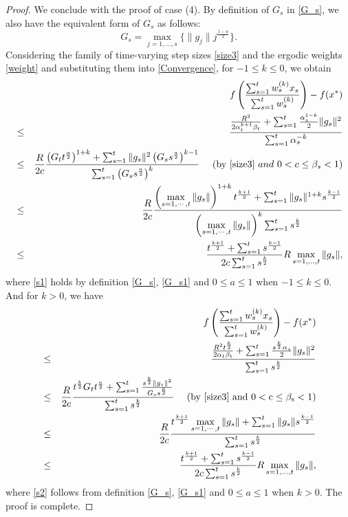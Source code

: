 \documentclass[sn-mathphys]{JORSC-jnl}%
\theoremstyle{thmstyleone}%
\theoremstyle{thmstylethree}%
\begin{document}
\begin{proof}
	We conclude with the proof of case (4). By definition of $G_s$ in \eqref{G_s}, we also have the equivalent form of $G_s$ as follows:
	\begin{equation}\label{G_s1}
		G_s = \max\limits_{j=1,\dots,s}{\{\|g_j\|j^{\frac{1-a}{2}}\}}.
	\end{equation}
	Considering the family of time-varying step sizes \eqref{size3} and the ergodic weights \eqref{weight} and substituting them into \eqref{Convergence}, for $-1 \le k \le 0$, we obtain
	\begin{eqnarray}
		&&f\left( \frac{\sum_{s=1}^t w_s^{(k)} x_s}{\sum_{s=1}^t w_s^{(k)}} \right) - f(x^*)\nonumber \\
		&\leq& \frac{\frac{R^2}{2\alpha_t^{k+1}\beta_t}+\sum_{s=1}^t\frac{\alpha_s^{1-k}}{2}\Vert g_s \Vert^2}{\sum_{s=1}^t \alpha_s^{-k}}\nonumber \\
		&\leq&
		\frac{R}{2c}\frac{\left({G_t t^{\frac{a}{2}}}\right)^{1+k}+\sum_{s=1}^t\Vert g_s \Vert^2 \left({G_s s^{\frac{a}{2}}}\right)^{k-1}}{\sum_{s=1}^t \left({G_s s^{\frac{a}{2}}}\right)^{k}} ~~~~({\rm by~ \eqref{size3}}~and ~0 < c \leq \beta_s <1)\nonumber \\
		&\leq&
		\frac{R}{2c}\frac{\left({\max\limits_{s=1,\cdots,t}{\|g_s\|}}\right)^{1+k}t^{\frac{k+1}{2}}+\sum_{s=1}^t\Vert g_s \Vert^{1+k}s^{\frac{k-1}{2}}}{\left({\max\limits_{s=1,\cdots,t}{\|g_s\|}}\right)^{k}\sum_{s=1}^t s^{\frac{k}{2}}} \label{s1}\\
		&\leq&
		\frac{t^{\frac{k+1}{2}} +\sum_{s=1}^{t} s^{\frac{k-1}{2}}}{2c\sum_{s=1}^{t} s^{\frac{k}{2}}} R\max\limits_{s=1,\dots,t}{\|g_s\|}, \nonumber
	\end{eqnarray}
	where \eqref{s1} holds by definition \eqref{G_s}, \eqref{G_s1} and $0 \leq a \leq 1$ when $-1 \leq k \leq 0$. And for $k > 0$, we have
	\begin{eqnarray}
		&&f\left( \frac{\sum_{s=1}^t w_s^{(k)} x_s}{\sum_{s=1}^t w_s^{(k)}} \right) - f(x^*)\nonumber \\
		&\leq& \frac{\frac{R^2 t^{\frac{k}{2}}}{2\alpha_t\beta_t}+\sum_{s=1}^t\frac{s^{\frac{k}{2}}\alpha_s}{2}\Vert g_s \Vert^2}{\sum_{s=1}^t s^{\frac{k}{2}}} \nonumber \\
		&\leq& \frac{R}{2c}\frac{t^{\frac{k}{2}}G_t t^{\frac{a}{2}}+\sum_{s=1}^t\frac{s^{\frac{k}{2}}\Vert g_s \Vert^2}{G_s s^{\frac{a}{2}}}}{\sum_{s=1}^t s^{\frac{k}{2}}} ~~~~({\rm by~ \eqref{size3}~ and ~0 < c \leq \beta_s <1})\nonumber \\
		&\leq& \frac{R}{2c}\frac{t^{\frac{k+1}{2}}\max\limits_{s=1,\cdots,t}{\|g_s\|}+\sum_{s=1}^t\Vert g_s \Vert s^{\frac{k-1}{2}}}{\sum_{s=1}^t s^{\frac{k}{2}}}\label{s2} \\
		&\leq&
		\frac{t^{\frac{k+1}{2}} +\sum_{s=1}^{t} s^{\frac{k-1}{2}}}{2c\sum_{s=1}^{t} s^{\frac{k}{2}}} R\max\limits_{s=1,\dots,t}{\|g_s\|}, \nonumber
	\end{eqnarray}
	where \eqref{s2} follows from definition \eqref{G_s}, \eqref{G_s1} and $0 \leq a \leq 1$ when $k > 0$. The proof is complete.
\end{proof}
\end{document}
